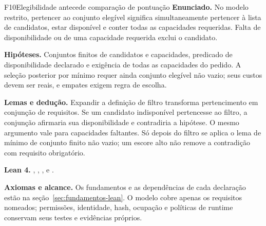\begin{formalizacao}{F10}{Elegibilidade antecede comparação de pontuação}
\textbf{Enunciado.} No modelo restrito, pertencer ao conjunto elegível
significa simultaneamente pertencer à lista de candidatos, estar disponível
e conter todas as capacidades requeridas. Falta de disponibilidade ou de
uma capacidade requerida exclui o candidato.

\textbf{Hipóteses.} Conjuntos finitos de candidatos e capacidades, predicado
de disponibilidade declarado e exigência de todas as capacidades do pedido.
A seleção posterior por mínimo requer ainda conjunto elegível não vazio;
seus custos devem ser reais, e empates exigem regra de escolha.

\textbf{Lemas e dedução.} Expandir a definição de filtro transforma
pertencimento em conjunção de requisitos. Se um candidato indisponível
pertencesse ao filtro, a conjunção afirmaria sua disponibilidade e
contradiria a hipótese. O mesmo argumento vale para capacidades faltantes.
Só depois do filtro se aplica o lema de mínimo de conjunto finito não vazio;
um escore alto não remove a contradição com requisito obrigatório.

\textbf{Lean 4.} ,
,
,
 e
.

\textbf{Axiomas e alcance.} Os fundamentos e as dependências de cada
declaração estão na seção~\ref{sec:fundamentos-lean}. O modelo cobre
apenas os requisitos nomeados; permissões, identidade, hash, ocupação e
políticas de runtime conservam seus testes e evidências próprios.
\end{formalizacao}

